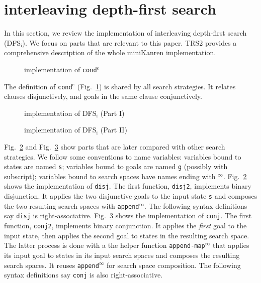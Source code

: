 \documentclass[format=acmlarge, review=true, authordraft=true]{acmart}
\newcommand{\conde}{\texttt{cond$^e$}}
\newcommand{\conj}{\texttt{conj}}
\newcommand{\disj}{\texttt{disj}}
\newcommand{\DFSi }[0]{DFS$_\textrm{i}$}
\begin{document}
\section{interleaving depth-first search}

In this section, we review the implementation of interleaving depth-first 
search (\DFSi). We focus on parts that are relevant to this paper. TRS2 
\citep{friedman_reasoned_2018} provides a comprehensive description of the 
whole miniKanren implementation.

\begin{figure}
	
	\caption{implementation of \conde}
	\label{conde}
\end{figure}

The definition of \conde{} (Fig.~\ref{conde}) is shared by all search 
strategies. It relates clauses disjunctively, and goals in the same 
clause conjunctively.

\begin{figure}
	
	\caption{implementation of \DFSi{} (Part I)}
	\label{DFSi-0}
\end{figure}

\begin{figure}
	
	\caption{implementation of \DFSi{} (Part II)}
	\label{DFSi-1}
\end{figure}


Fig.~\ref{DFSi-0} and Fig.~\ref{DFSi-1} show parts that are later compared 
with other search 
strategies. We follow some conventions to name variables: variables bound to 
states are named \texttt{s}; variables bound to goals are named \texttt{g} 
(possibly with subscript); variables bound to search spaces have names ending 
with $^\infty$. Fig.~\ref{DFSi-0} shows the implementation of \disj. The 
first function, \texttt{disj2}, implements binary disjunction. It applies the 
two disjunctive goals to the input state \texttt{s} and composes the two 
resulting search spaces with \texttt{append$^\infty$}. The following syntax 
definitions say \disj{} is right-associative. Fig.~\ref{DFSi-1} 
shows the implementation of \conj. The first function, \texttt{conj2}, 
implements binary conjunction. 
It applies the \emph{first} goal to the input state, then applies the second 
goal to states in the resulting search space. The latter process is done with a 
the helper function \texttt{append-map$^\infty$} that applies its input goal to states 
in its input search spaces and composes the resulting search spaces. It reuses 
\texttt{append$^\infty$} for search space composition. The following syntax 
definitions say \conj{} is also right-associative.
\end{document}

